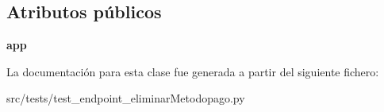 \subsection*{Atributos públicos}
\begin{DoxyCompactItemize}
\item 
\hypertarget{classsrc_1_1tests_1_1test__endpoint__eliminar_metodopago_1_1_test_endpoint_eliminar_metodopago_a3ac2a9d664fa556742b378ddd61bc3bb}{{\bfseries app}}\label{classsrc_1_1tests_1_1test__endpoint__eliminar_metodopago_1_1_test_endpoint_eliminar_metodopago_a3ac2a9d664fa556742b378ddd61bc3bb}

\end{DoxyCompactItemize}


La documentación para esta clase fue generada a partir del siguiente fichero\-:\begin{DoxyCompactItemize}
\item 
src/tests/test\-\_\-endpoint\-\_\-eliminar\-Metodopago.\-py\end{DoxyCompactItemize}
